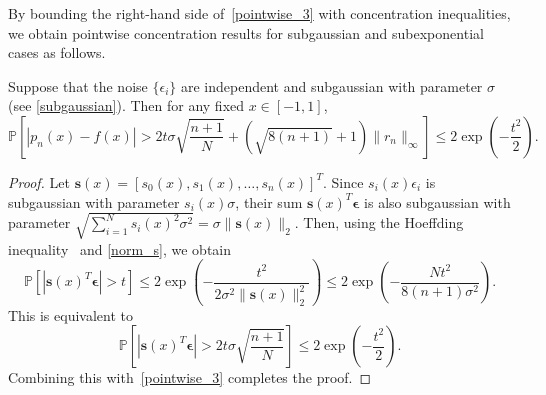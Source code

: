 \documentclass[final,onefignum,onetabnum]{siamart220329}
\newcommand{\vct}[1]{\bm{#1}}
\begin{document}
By bounding the right-hand side of~\eqref{pointwise_3}
with concentration inequalities, we obtain pointwise concentration results for subgaussian and subexponential cases as follows.




\begin{theorem}\label{thm:point}  
	Suppose that the noise $ \{ \epsilon_i \}$ are independent and subgaussian with parameter $\sigma$ (see \eqref{subgaussian}). Then for any fixed $x\in[-1,1]$, 
	\begin{equation*}
		\mathbb{P} \left[ |p_n(x)-f(x)|>2 t \sigma \sqrt{\frac{n+1}{N}}+(\sqrt{8(n+1)} + 1) \|r_n\|_\infty \right]\leq 2 \exp \left( -\frac{t^2}{2} \right). 
	\end{equation*}
\end{theorem}
\begin{proof}  
	Let $\vct{s}(x)=[s_0(x),s_1(x),\dots,s_n(x)]^T$.
	Since $s_i (x) \epsilon_i$ is subgaussian with parameter $s_i(x) \sigma$, their sum $\vct{s}(x)^T \vct{\epsilon}$ is also subgaussian with parameter $\sqrt{\sum_{i=1}^Ns_i(x)^2\sigma^2}= \sigma \|\vct{s}(x)\|_2$.
	Then, using the Hoeffding inequality~\cite[Ch.~2]{wainwright2019high} and \eqref{norm_s}, {we obtain}
	\[
	\mathbb{P}[|\vct{s}(x)^T \vct{\epsilon}|>t] \leq 2 \exp \left( -\frac{t^2}{2 \sigma^2 \| \vct{s}(x) \|_2^2} \right) \leq 2 \exp \left( -\frac{N t^2}{8 (n+1) \sigma^2} \right).
	\]
	This is equivalent to 
	\[
	\mathbb{P} \left[ |\vct{s}(x)^T \vct{\epsilon}|>2 t \sigma \sqrt{\frac{n+1}{N}} \right] \leq 2 \exp \left( -\frac{t^2}{2} \right).
	\]
	Combining this with~\eqref{pointwise_3} completes the proof. 
\end{proof}
\end{document}

